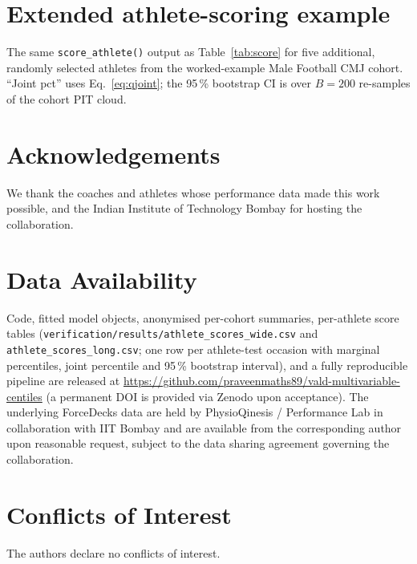 \documentclass[10pt]{article}
\begin{document}
\section{Extended athlete-scoring example}
\label{app:score_extended}
\noindent The same \texttt{score\_athlete()} output as
Table~\ref{tab:score} for five additional, randomly selected athletes
from the worked-example Male Football CMJ cohort. ``Joint pct'' uses
Eq.~\eqref{eq:qjoint}; the 95\,\% bootstrap CI is over $B = 200$
re-samples of the cohort PIT cloud.
\smallskip
\begin{center}

\end{center}
\label{tab:score_extended}

\section*{Acknowledgements}
We thank the coaches and athletes whose performance data
made this work possible, and the Indian Institute of Technology
Bombay for hosting the collaboration.

\section*{Data Availability}
Code, fitted model objects, anonymised per-cohort summaries,
per-athlete score tables (\texttt{verification/results/athlete\_scores\_wide.csv}
and \texttt{athlete\_scores\_long.csv}; one row per athlete-test
occasion with marginal percentiles, joint percentile and 95\,\%
bootstrap interval), and a fully reproducible pipeline are
released at
\url{https://github.com/praveenmaths89/vald-multivariable-centiles}
(a permanent DOI is provided via Zenodo upon acceptance).
The underlying ForceDecks data are held by PhysioQinesis /
Performance Lab in collaboration with IIT Bombay and are
available from the corresponding author upon reasonable request,
subject to the data sharing agreement governing the collaboration.

\section*{Conflicts of Interest}
The authors declare no conflicts of interest.

{\small

}
\end{document}
